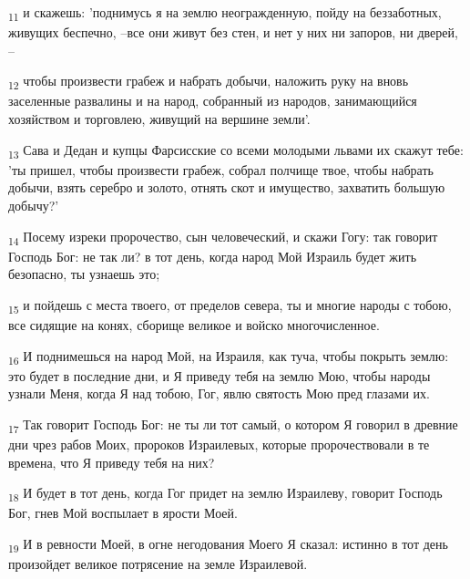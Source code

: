 \begin{tcolorbox}
\textsubscript{11} и скажешь: 'поднимусь я на землю неогражденную, пойду на беззаботных, живущих беспечно, --все они живут без стен, и нет у них ни запоров, ни дверей, --
\end{tcolorbox}
\begin{tcolorbox}
\textsubscript{12} чтобы произвести грабеж и набрать добычи, наложить руку на вновь заселенные развалины и на народ, собранный из народов, занимающийся хозяйством и торговлею, живущий на вершине земли'.
\end{tcolorbox}
\begin{tcolorbox}
\textsubscript{13} Сава и Дедан и купцы Фарсисские со всеми молодыми львами их скажут тебе: 'ты пришел, чтобы произвести грабеж, собрал полчище твое, чтобы набрать добычи, взять серебро и золото, отнять скот и имущество, захватить большую добычу?'
\end{tcolorbox}
\begin{tcolorbox}
\textsubscript{14} Посему изреки пророчество, сын человеческий, и скажи Гогу: так говорит Господь Бог: не так ли? в тот день, когда народ Мой Израиль будет жить безопасно, ты узнаешь это;
\end{tcolorbox}
\begin{tcolorbox}
\textsubscript{15} и пойдешь с места твоего, от пределов севера, ты и многие народы с тобою, все сидящие на конях, сборище великое и войско многочисленное.
\end{tcolorbox}
\begin{tcolorbox}
\textsubscript{16} И поднимешься на народ Мой, на Израиля, как туча, чтобы покрыть землю: это будет в последние дни, и Я приведу тебя на землю Мою, чтобы народы узнали Меня, когда Я над тобою, Гог, явлю святость Мою пред глазами их.
\end{tcolorbox}
\begin{tcolorbox}
\textsubscript{17} Так говорит Господь Бог: не ты ли тот самый, о котором Я говорил в древние дни чрез рабов Моих, пророков Израилевых, которые пророчествовали в те времена, что Я приведу тебя на них?
\end{tcolorbox}
\begin{tcolorbox}
\textsubscript{18} И будет в тот день, когда Гог придет на землю Израилеву, говорит Господь Бог, гнев Мой воспылает в ярости Моей.
\end{tcolorbox}
\begin{tcolorbox}
\textsubscript{19} И в ревности Моей, в огне негодования Моего Я сказал: истинно в тот день произойдет великое потрясение на земле Израилевой.
\end{tcolorbox}
